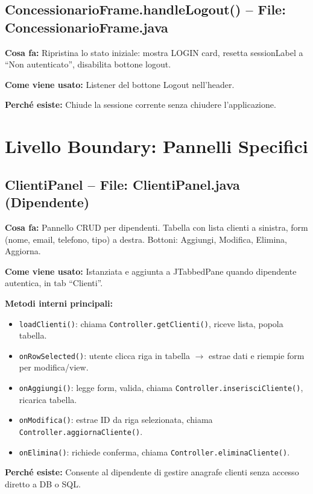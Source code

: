 \documentclass[12pt,a4paper]{article}
\begin{document}
\subsection{ConcessionarioFrame.handleLogout() -- File: ConcessionarioFrame.java}

\textbf{Cosa fa:}
Ripristina lo stato iniziale: mostra LOGIN card, resetta sessionLabel a ``Non autenticato'', disabilita bottone logout.

\textbf{Come viene usato:}
Listener del bottone Logout nell'header.

\textbf{Perché esiste:}
Chiude la sessione corrente senza chiudere l'applicazione.

\section{Livello Boundary: Pannelli Specifici}

\subsection{ClientiPanel -- File: ClientiPanel.java (Dipendente)}

\textbf{Cosa fa:}
Pannello CRUD per dipendenti. Tabella con lista clienti a sinistra, form (nome, email, telefono, tipo) a destra.
Bottoni: Aggiungi, Modifica, Elimina, Aggiorna.

\textbf{Come viene usato:}
Istanziata e aggiunta a JTabbedPane quando dipendente autentica, in tab ``Clienti''.

\textbf{Metodi interni principali:}

\begin{itemize}
  \item \texttt{loadClienti()}: chiama \texttt{Controller.getClienti()}, riceve lista, popola tabella.
  \item \texttt{onRowSelected()}: utente clicca riga in tabella $\to$ estrae dati e riempie form per modifica/view.
  \item \texttt{onAggiungi()}: legge form, valida, chiama \texttt{Controller.inserisciCliente()}, ricarica tabella.
  \item \texttt{onModifica()}: estrae ID da riga selezionata, chiama \texttt{Controller.aggiornaCliente()}.
  \item \texttt{onElimina()}: richiede conferma, chiama \texttt{Controller.eliminaCliente()}.
\end{itemize}

\textbf{Perché esiste:}
Consente al dipendente di gestire anagrafe clienti senza accesso diretto a DB o SQL.
\end{document}
